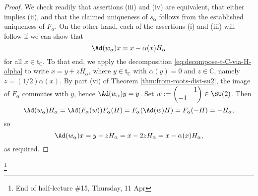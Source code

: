 \documentclass[reqno]{amsart} 
\begin{document}
\begin{proof}
  We check readily that assertions (iii) and (iv) are equivalent, that either implies (ii), and that the claimed uniqueness of $s_\alpha$ follows from the established uniqueness of $F_\alpha$.  On the other hand, each of the assertions (i) and (iii) will follow if we can show that
  \begin{equation*}
    \Ad(w_\alpha) x = x - \alpha(x) H_\alpha 
  \end{equation*}
  for all $x \in \mathfrak{t}_{\mathbb{C}}$.  To that end, we apply the decomposition \eqref{eq:decompose-t-C-via-H-alpha} to write $x = y + z H_\alpha$, where $y \in \mathfrak{t}_{\mathbb{C}}$ with $\alpha(y) = 0$ and $z \in \mathbb{C}$, namely $z = (1/2) \alpha(x)$.  By part (vi) of Theorem \ref{thm:from-roots-dist-su2}, the image of $F_\alpha$ commutes with $y$, hence $\Ad(w_\alpha) y = y$.  Set $w := 
\begin{pmatrix}
    & 1 \\
    -1 &
  \end{pmatrix}
 \in \SU(2)$.  Then
 \begin{equation*}
   \Ad(w_\alpha) H_\alpha
   = \Ad(F_\alpha(w)) F_\alpha(H)
   = F_\alpha(\Ad(w) H)
   = F_\alpha(-H) = - H_\alpha,
 \end{equation*}
 so
 \begin{equation*}
   \Ad(w_\alpha) x = y - z H_\alpha
   = x - 2 z H_\alpha
   = x - \alpha(x) H_\alpha,
 \end{equation*}
 as required.
\end{proof}
\footnote{End of half-lecture \#15, Thursday, 11 Apr}
\end{document}
